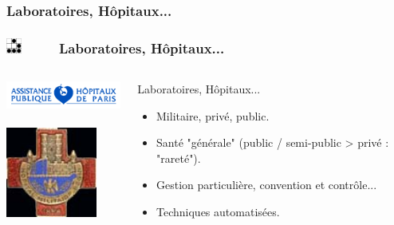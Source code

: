 \documentclass[slidetop,11pt]{beamer}
\def\sectionPartIIbUN{Laboratoires, H{\^o}pitaux...}
\def\moreInFrameTitle{\includegraphics[height=0.5cm]{img/logo_glider.png}~~~~~}
\begin{document}
\subsubsection{\sectionPartIIbUN}
\begin{frame}
	\frametitle{\moreInFrameTitle \sectionPartIIbUN}
	\begin{columns}[T]
	\begin{column}[T]{5cm}
		\includegraphics[width=4cm]{img/logo_aphp.png}~\\
		\includegraphics[width=3cm]{img/logo_hia_begin.png}~\\
	\end{column}
	\begin{column}[T]{7cm}
		\begin{beamerboxesrounded}	[lower=substructureTR, %
		 				 upper=block title TR,%
						 shadow=true]%
		       {\sectionPartIIbUN}
			\begin{itemize}
				\item Militaire, priv{\'e}, public. 
				\item Sant{\'e} "g{\'e}n{\'e}rale" (public / semi-public > priv{\'e} : "raret{\'e}"). 
				\item Gestion particuli{\`e}re, convention et contr{\^o}le...
				\item Techniques automatis{\'e}es. 
			\end{itemize}
		\end{beamerboxesrounded}
	\end{column}
	\end{columns}
\end{frame}
\end{document}
